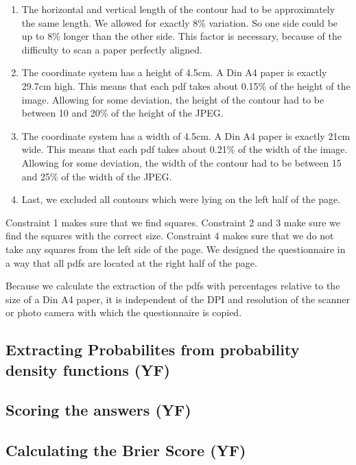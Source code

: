 \documentclass[../main/main.tex]{subfiles}
\begin{document}
	\begin{enumerate}
		\item The horizontal and vertical length of the contour had to be approximately the same length. We allowed for exactly 8\% variation. So one side could be up to 8\% longer than the other side. This factor is necessary, because of the difficulty to scan a paper perfectly aligned.
		\item The coordinate system has a height of 4.5cm. A Din A4 paper is exactly 29.7cm high. This means that each pdf takes about 0.15\% of the height of the image. Allowing for some deviation, the height of the contour had to be between 10 and 20\% of the height of the JPEG. 
		\item The coordinate system has a width of 4.5cm. A Din A4 paper is exactly 21cm wide. This means that each pdf takes about 0.21\% of the width of the image. Allowing for some deviation, the width of the contour had to be between 15 and 25\% of the width of the JPEG. 
		\item Last, we excluded all contours which were lying on the left half of the page.
	\end{enumerate}

	\noindent Constraint 1 makes sure that we find squares. Constraint 2 and 3 make sure we find the squares with the correct size. Constraint 4 makes sure that we do not take any squares from the left side of the page. We designed the questionnaire in a way that all pdfs are located at the right half of the page.
	
	Because we calculate the extraction of the pdfs with percentages relative to the size of a Din A4 paper, it is independent of the DPI and resolution of the scanner or photo camera with which the questionnaire is copied.
	
	\subsection{Extracting Probabilites from probability density functions (YF)}
	
	\subsection{Scoring the answers (YF)}
	
	\subsection{Calculating the Brier Score (YF)}
\end{document}
